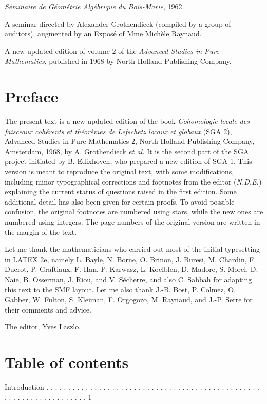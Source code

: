 \documentclass[
  11pt,
  a4paper,
]{book}
\begin{document}
\emph{Séminaire de Géométrie Algébrique du Bois-Marie}, 1962.

A seminar directed by Alexander Grothendieck (compiled by a group of
auditors), augmented by an Exposé of Mme Michèle Raynaud.

A new updated edition of volume 2 of the \emph{Advanced Studies in Pure
Mathematics}, published in 1968 by North-Holland Publishing Company.

\section{Preface}\label{preface}

The present text is a new updated edition of the book \emph{Cohomologie
locale des faisceaux cohérents et théorèmes de Lefschetz locaux et
globaux} (SGA 2), Advanced Studies in Pure Mathematics 2, North-Holland
Publishing Company, Amsterdam, 1968, by A. Grothendieck \emph{et al.} It
is the second part of the SGA project initiated by B. Edixhoven, who
prepared a new edition of SGA 1. This version is meant to reproduce the
original text, with some modifications, including minor typographical
corrections and footnotes from the editor (\emph{N.D.E.}) explaining the
current status of questions raised in the first edition. Some additional
detail has also been given for certain proofs. To avoid possible
confusion, the original footnotes are numbered using stars, while the
new ones are numbered using integers. The page numbers of the original
version are written in the margin of the text.

Let me thank the mathematicians who carried out most of the initial
typesetting in LATEX 2e, namely L. Bayle, N. Borne, O. Brinon, J.
Buresi, M. Chardin, F. Ducrot, P. Graftiaux, F. Han, P. Karwasz, L.
Koelblen, D. Madore, S. Morel, D. Naie, B. Osserman, J. Riou, and V.
Sécherre, and also C. Sabbah for adapting this text to the SMF layout.
Let me also thank J.-B. Bost, P. Colmez, O. Gabber, W. Fulton, S.
Kleiman, F. Orgogozo, M. Raynaud, and J.-P. Serre for their comments and
advice.

The editor, Yves Laszlo.

\section{Table of contents}\label{table-of-contents}

Introduction . . . . . . . . . . . . . . . . . . . . . . . . . . . . . .
. . . . . . . . . . . . . . . . . . . . . . . . . . . . . . . . . . . .
. . 1
\end{document}
